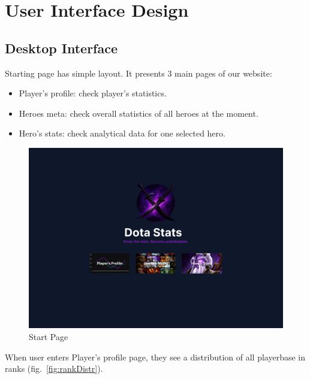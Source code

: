 \section{User Interface Design}

    \subsection{Desktop Interface}

    Starting page has simple layout.
    It presents 3 main pages of our website:
    \begin{itemize}
        \item Player's profile: check player's statistics.
        \item Heroes meta: check overall statistics of all heroes at the moment.
        \item Hero's stats: check analytical data for one selected hero.
    \end{itemize}


    \begin{figure}[ht]
        \centering
        \includegraphics[width=\textwidth]{images/Start}
        \caption{Start Page}
    \end{figure}

    When user enters Player's profile page, they see a distribution of all playerbase in ranks (fig.~\ref{fig:rankDistr}).

